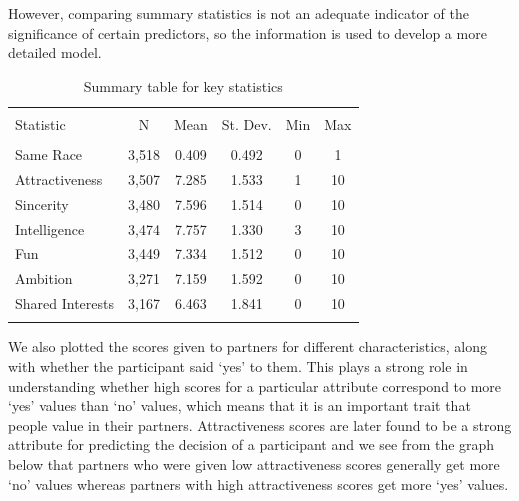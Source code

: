\documentclass{article}
\begin{document}
However, comparing summary statistics is not an adequate indicator of the significance of certain predictors, so the information is used to develop a more detailed model. \\
\begin{table}[!htbp] \centering 
  \caption{Summary table for key statistics} 
  \label{fig:sum_table} 
\begin{tabular}{@{\extracolsep{5pt}}lccccc} 
\\[-1.8ex]\hline 
\hline \\[-1.8ex] 
Statistic & \multicolumn{1}{c}{N} & \multicolumn{1}{c}{Mean} & \multicolumn{1}{c}{St. Dev.} & \multicolumn{1}{c}{Min} & \multicolumn{1}{c}{Max} \\ 
\hline \\[-1.8ex] 
Same Race & 3,518 & 0.409 & 0.492 & 0 & 1 \\ 
Attractiveness & 3,507 & 7.285 & 1.533 & 1 & 10 \\ 
Sincerity & 3,480 & 7.596 & 1.514 & 0 & 10 \\ 
Intelligence & 3,474 & 7.757 & 1.330 & 3 & 10 \\ 
Fun & 3,449 & 7.334 & 1.512 & 0 & 10 \\ 
Ambition & 3,271 & 7.159 & 1.592 & 0 & 10 \\ 
Shared Interests & 3,167 & 6.463 & 1.841 & 0 & 10 \\ 
\hline \\[-1.8ex] 
\end{tabular} 
\end{table} 
%
We also plotted the scores given to partners for different characteristics, along with whether the participant said `yes' to them. This plays a strong role in understanding whether high scores for a particular attribute correspond to more `yes' values than `no' values, which means that it is an important trait that people value in their partners. Attractiveness scores are later found to be a strong attribute for predicting the decision of a participant and we see from the graph below that partners who were given low attractiveness scores generally get more `no' values whereas partners with high attractiveness scores get more `yes' values.\\
\end{document}
